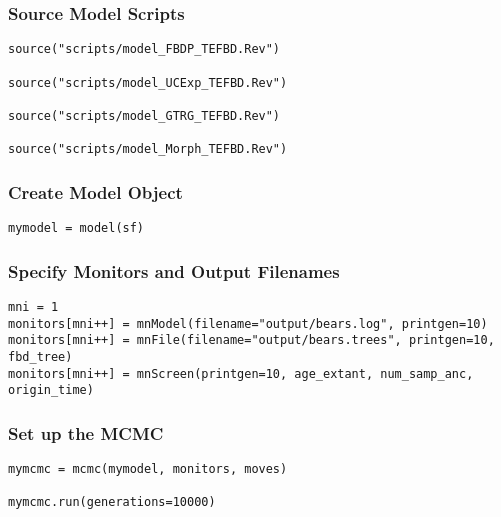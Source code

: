 \medskip
\subsubsection{Source Model Scripts}\label{subsub:RB-SourceMods}
{\tt \begin{snugshade*}
\begin{lstlisting}
source("scripts/model_FBDP_TEFBD.Rev")

source("scripts/model_UCExp_TEFBD.Rev")

source("scripts/model_GTRG_TEFBD.Rev")

source("scripts/model_Morph_TEFBD.Rev")
\end{lstlisting}
\end{snugshade*}}



\medskip
\subsubsection{Create Model Object}\label{subsub:RB-ModObj}


{\tt \begin{snugshade*}
\begin{lstlisting}
mymodel = model(sf)
\end{lstlisting}
\end{snugshade*}}

\medskip
\subsubsection{Specify Monitors and Output Filenames}\label{subsub:RB-Monitors}


{\tt \begin{snugshade*}
\begin{lstlisting}
mni = 1
monitors[mni++] = mnModel(filename="output/bears.log", printgen=10)
monitors[mni++] = mnFile(filename="output/bears.trees", printgen=10, fbd_tree)
monitors[mni++] = mnScreen(printgen=10, age_extant, num_samp_anc, origin_time)
\end{lstlisting}
\end{snugshade*}}

\medskip
\subsubsection{Set up the MCMC}


{\tt \begin{snugshade*}
\begin{lstlisting}
mymcmc = mcmc(mymodel, monitors, moves)

mymcmc.run(generations=10000)
\end{lstlisting}
\end{snugshade*}}

